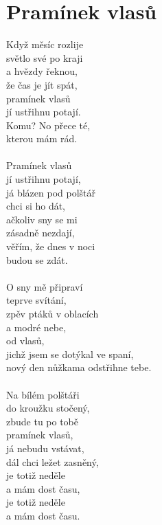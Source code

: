 \section{Pramínek vlasů}
Když měsíc rozlije\\
světlo své po kraji\\
a hvězdy řeknou,\\
že čas je jít spát,\\
pramínek vlasů\\
jí ustřihnu potají. \\
Komu? No přece té,\\
kterou mám rád.\\
\\
Pramínek vlasů\\
jí ustřihnu potají,\\
já blázen pod polštář\\
chci si ho dát,\\
ačkoliv sny se mi\\
zásadně nezdají,\\
věřím, že dnes v noci\\
budou se zdát.\\
\\
O sny mě připraví\\
teprve svítání,\\
zpěv ptáků v oblacích\\
a modré nebe,\\
od vlasů, \\
jichž jsem se dotýkal ve spaní,\\
nový den nůžkama odstřihne tebe. \\
\\
Na bílém polštáři \\
do kroužku stočený,\\
zbude tu po tobě\\
pramínek vlasů,\\
já nebudu vstávat,\\
dál chci ležet zasněný,\\
je totiž neděle\\
a mám dost času,\\
je totiž neděle \\
a mám dost času.\\